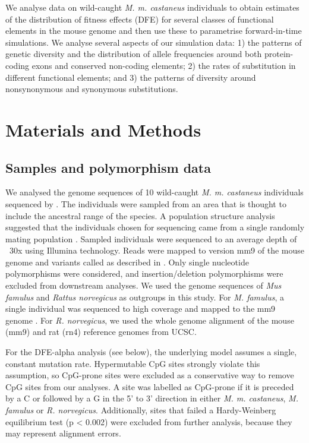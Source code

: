 	We analyse data on wild-caught \textit{M. m. castaneus} individuals to obtain estimates of the distribution of fitness effects (DFE) for several classes of functional elements in the mouse genome and then use these to parametrise forward-in-time simulations. We analyse several aspects of our simulation data: 1) the patterns of genetic diversity and the distribution of allele frequencies around both protein-coding exons and conserved non-coding elements; 2) the rates of substitution in different functional elements; and 3) the patterns of diversity around nonsynonymous and synonymous substitutions.
\section{Materials and Methods}

\subsection{Samples and polymorphism data}
 
	We analysed the genome sequences of 10 wild-caught \textit{M. m. castaneus} individuals sequenced by \cite{RN122}. The individuals were sampled from an area that is thought to include the ancestral range of the species\citep{RN233}. A population structure analysis suggested that the individuals chosen for sequencing came from a single randomly mating population \citep{RN158}. Sampled individuals were sequenced to an average depth of ~30x using Illumina technology. Reads were mapped to version mm9 of the mouse genome and variants called as described in \cite{RN122}. Only single nucleotide polymorphisms were considered, and insertion/deletion polymorphisms were excluded from downstream analyses. We used the genome sequences of \textit{Mus famulus} and \textit{Rattus norvegicus} as outgroups in this study. For \textit{M. famulus}, a single individual was sequenced to high coverage and mapped to the mm9 genome \citep{RN122}. For \textit{R. norvegicus}, we used the whole genome alignment of the mouse (mm9) and rat (rn4) reference genomes from UCSC. 

	For the DFE-alpha analysis (see below), the underlying model assumes a single, constant mutation rate. Hypermutable CpG sites strongly violate this assumption, so CpG-prone sites were excluded as a conservative way to remove CpG sites from our analyses. A site was labelled as CpG-prone if it is preceded by a C or followed by a G in the 5’ to 3’ direction in either \textit{M. m. castaneus}, \textit{M. famulus} or \textit{R. norvegicus}. Additionally, sites that failed a Hardy-Weinberg equilibrium test (p < 0.002) were excluded from further analysis, because they may represent alignment errors.
 

